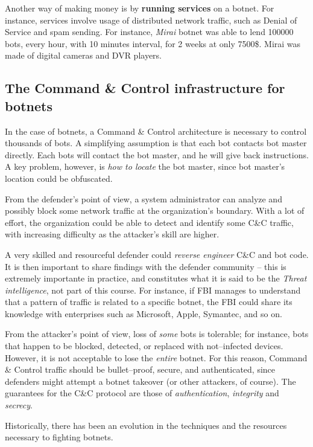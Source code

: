 \documentclass[10pt]{\classname}
\begin{document}
Another way of making money is by \textbf{running services} on a botnet. For
instance, services involve usage of distributed network traffic, such as Denial
of Service and spam sending. For instance, \emph{Mirai} botnet was able to lend
100000 bots, every hour, with 10 minutes interval, for 2 weeks at only 7500\$.
Mirai was made of digital cameras and DVR players.

\subsection{The Command \& Control infrastructure for botnets}

In the case of botnets, a Command \& Control architecture is necessary to
control thousands of bots. A simplifying assumption is that each bot contacts
bot master directly. Each bots will contact the bot master, and he will give
back instructions. A key problem, however, is \emph{how to locate} the bot
master, since bot master's location could be obfuscated.

From the defender's point of view, a system administrator can analyze and
possibly block some network traffic at the organization's boundary. With a lot
of effort, the organization could be able to detect and identify some C\&C
traffic, with increasing difficulty as the attacker's skill are higher.

A very skilled and resourceful defender could \emph{reverse engineer} C\&C and
bot code. It is then important to share findings with the defender community --
this is extremely importante in practice, and constitutes what it is said to be
the \emph{Threat intelligence}, not part of this course. For instance, if FBI
manages to understand that a pattern of traffic is related to a specific
botnet, the FBI could share its knowledge with enterprises such as Microsoft,
Apple, Symantec, and so on.

From the attacker's point of view, loss of \emph{some} bots is tolerable; for
instance, bots that happen to be blocked, detected, or replaced with
not--infected devices. However, it is not acceptable to lose the \emph{entire}
botnet. For this reason, Command \& Control traffic should be bullet--proof,
secure, and authenticated, since defenders might attempt a botnet takeover (or
other attackers, of course). The guarantees for the C\&C protocol are those of
\emph{authentication}, \emph{integrity} and \emph{secrecy}.

Historically, there has been an evolution in the techniques and the resources
necessary to fighting botnets.
\end{document}
